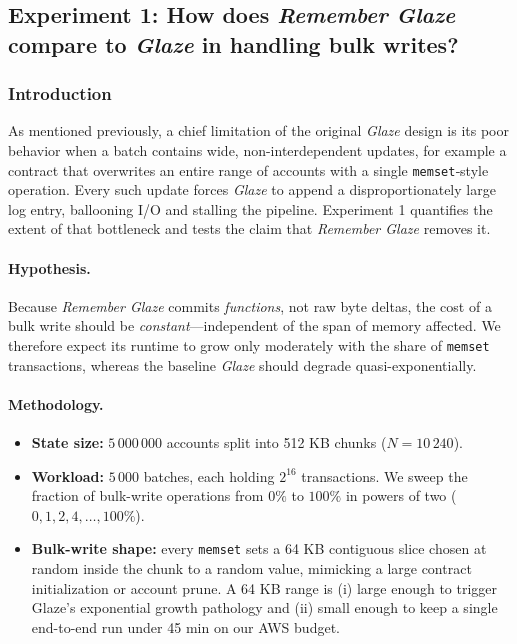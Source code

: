 \documentclass[conference]{IEEEtran}
\begin{document}
\subsection{Experiment 1: How does \textit{Remember Glaze} compare to \textit{Glaze} in handling bulk writes?}

\subsubsection{Introduction}
As mentioned previously, a chief limitation of the original \textit{Glaze} design is its poor behavior when a batch contains wide, non-interdependent updates, for example a
contract that overwrites an entire range of accounts with a single
\texttt{memset}‐style operation.  Every such update forces \textit{Glaze} to
 append a disproportionately large log entry, ballooning I/O and stalling the pipeline.  Experiment 1 quantifies the extent of that bottleneck and tests the claim that \textit{Remember Glaze} removes it.

\paragraph{Hypothesis.}
Because \textit{Remember Glaze} commits \emph{functions}, not raw byte
deltas, the cost of a bulk write should be \emph{constant}—independent of the
span of memory affected.  We therefore expect its runtime to grow only
moderately with the share of \texttt{memset} transactions, whereas the
baseline \textit{Glaze} should degrade quasi-exponentially.

\paragraph{Methodology.}
\begin{itemize}
  \item \textbf{State size:} \(5\,000\,000\) accounts split into
        512 KB chunks (\(N=10\,240\)).
  \item \textbf{Workload:} \(5\,000\) batches, each holding \(2^{16}\)
        transactions.  We sweep the fraction of bulk-write operations from
        \(0\%\) to \(100\%\) in powers of two
        (\(0,1,2,4,\dots,100\%\)).
  \item \textbf{Bulk-write shape:} every \texttt{memset} sets a
        64 KB contiguous slice chosen at random inside the
        chunk to a random value, mimicking a large contract initialization or account prune. A 64 KB range is (i) large enough to trigger Glaze’s exponential growth
        pathology and (ii) small enough to keep a single end-to-end run under 45 min
        on our AWS budget.
\end{itemize}
\end{document}
